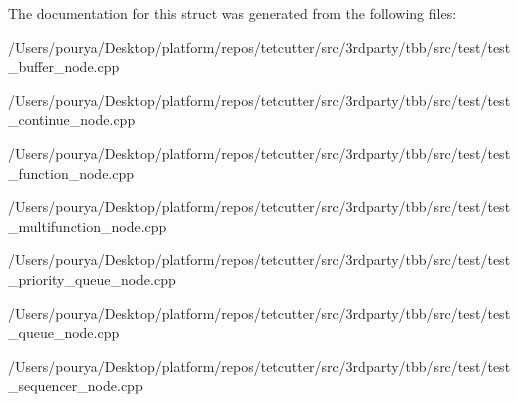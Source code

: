 The documentation for this struct was generated from the following files\+:\begin{DoxyCompactItemize}
\item 
/\+Users/pourya/\+Desktop/platform/repos/tetcutter/src/3rdparty/tbb/src/test/test\+\_\+buffer\+\_\+node.\+cpp\item 
/\+Users/pourya/\+Desktop/platform/repos/tetcutter/src/3rdparty/tbb/src/test/test\+\_\+continue\+\_\+node.\+cpp\item 
/\+Users/pourya/\+Desktop/platform/repos/tetcutter/src/3rdparty/tbb/src/test/test\+\_\+function\+\_\+node.\+cpp\item 
/\+Users/pourya/\+Desktop/platform/repos/tetcutter/src/3rdparty/tbb/src/test/test\+\_\+multifunction\+\_\+node.\+cpp\item 
/\+Users/pourya/\+Desktop/platform/repos/tetcutter/src/3rdparty/tbb/src/test/test\+\_\+priority\+\_\+queue\+\_\+node.\+cpp\item 
/\+Users/pourya/\+Desktop/platform/repos/tetcutter/src/3rdparty/tbb/src/test/test\+\_\+queue\+\_\+node.\+cpp\item 
/\+Users/pourya/\+Desktop/platform/repos/tetcutter/src/3rdparty/tbb/src/test/test\+\_\+sequencer\+\_\+node.\+cpp\end{DoxyCompactItemize}
